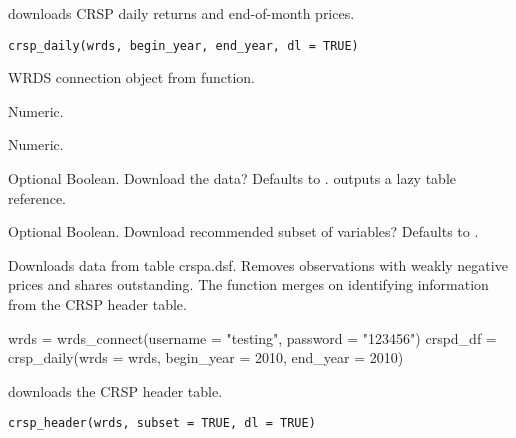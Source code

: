 \documentclass[a4paper]{book}
\begin{document}
%
\begin{Description}\relax
{} downloads CRSP daily returns and end-of-month prices.
\end{Description}
%
\begin{Usage}
\begin{verbatim}
crsp_daily(wrds, begin_year, end_year, dl = TRUE)
\end{verbatim}
\end{Usage}
%
\begin{Arguments}
\begin{ldescription}
\item[\code{wrds}] WRDS connection object from  function.

\item[\code{begin\_year}] Numeric.

\item[\code{end\_year}] Numeric.

\item[\code{dl}] Optional Boolean. Download the data? Defaults to .  outputs a
lazy  table reference.

\item[\code{subset}] Optional Boolean. Download recommended subset of variables? Defaults to .
\end{ldescription}
\end{Arguments}
%
\begin{Details}\relax
Downloads data from table crspa.dsf. Removes observations with weakly negative prices and
shares outstanding. The function merges on identifying information from the
CRSP header table.
\end{Details}
%
\begin{Examples}
\begin{ExampleCode}
wrds = wrds_connect(username = "testing", password = "123456")
crspd_df = crsp_daily(wrds = wrds, begin_year = 2010, end_year = 2010)
\end{ExampleCode}
\end{Examples}
%
\begin{Description}\relax
{} downloads the CRSP header table.
\end{Description}
%
\begin{Usage}
\begin{verbatim}
crsp_header(wrds, subset = TRUE, dl = TRUE)
\end{verbatim}
\end{Usage}
\end{document}
